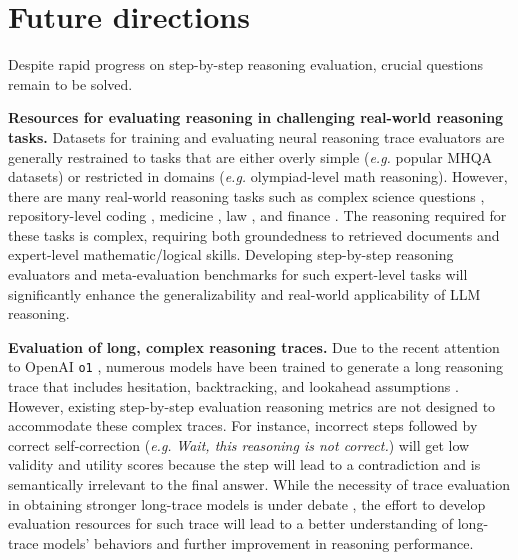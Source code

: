 \section{Future directions}
\label{sec:future-directions}

Despite  rapid progress on step-by-step reasoning evaluation, crucial questions remain to be solved.

\textbf{Resources for evaluating reasoning in challenging real-world reasoning tasks.} Datasets for training and evaluating neural reasoning trace evaluators are generally restrained to tasks that are either overly simple (\textit{e.g.} popular MHQA datasets) or restricted in domains (\textit{e.g.} olympiad-level math reasoning). However, there are many real-world reasoning tasks such as complex science questions \citep{rein2024gpqa}, repository-level coding \citep{zhang-etal-2023-repocoder}, medicine \citep{savage2024diagnostic}, law \citep{holzenberger-van-durme-2021-factoring, kimyeeun-etal-2024-developing}, and finance \citep{li-etal-2024-alphafin}. The reasoning required for these tasks is complex,  requiring both groundedness to retrieved documents and expert-level mathematic/logical skills. Developing step-by-step reasoning evaluators and meta-evaluation benchmarks for such expert-level tasks will significantly enhance the generalizability and real-world applicability of LLM reasoning.

\textbf{Evaluation of long, complex reasoning traces.} Due to the recent attention to OpenAI \texttt{o1} \citep{openai2024openaio1card}, numerous models have been trained to generate a long reasoning trace that includes hesitation, backtracking, and lookahead assumptions \citep{openai2024openaio1card, zhao2024marcoo1openreasoningmodels, deepseekai2025deepseekr1incentivizingreasoningcapability, muennighoff2025s1simpletesttimescaling}. However, existing step-by-step evaluation reasoning metrics are not designed to accommodate these complex traces. For instance, incorrect steps followed by correct self-correction (\textit{e.g.} \textit{Wait, this reasoning is not correct.}) will get low validity and utility scores because the step will lead to a contradiction and is semantically irrelevant to the final answer. While the necessity of trace evaluation in obtaining stronger long-trace models is under debate \citep{deepseekai2025deepseekr1incentivizingreasoningcapability}, the effort to develop evaluation resources for such trace will lead to a better understanding of long-trace models' behaviors and further improvement in reasoning performance.

